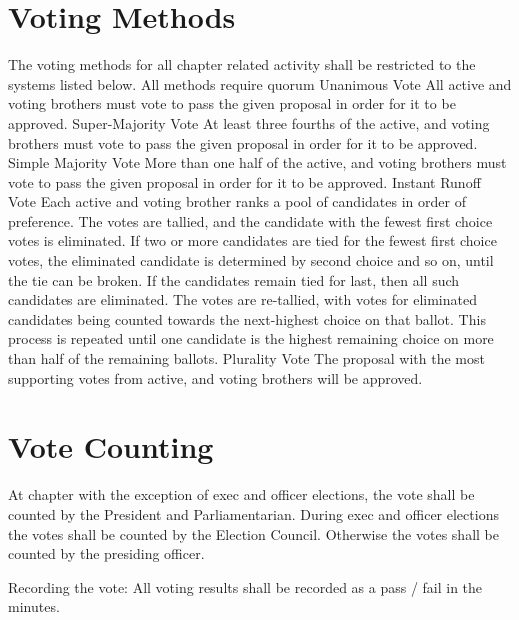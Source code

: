 \section{Voting Methods}
The voting methods for all chapter related activity shall be restricted to the systems listed below.
All methods require quorum
Unanimous Vote
All active and voting brothers must vote to pass the given proposal in order for it to be approved.
Super-Majority Vote
At least three fourths of the active, and voting brothers must vote to pass the given proposal in order for it to be approved.
Simple Majority Vote
More than one half of the active, and voting brothers must vote to pass the given proposal in order for it to be approved.
Instant Runoff Vote
Each active and voting brother ranks a pool of candidates in order of preference.
The votes are tallied, and the candidate with the fewest first choice votes is eliminated.
If two or more candidates are tied for the fewest first choice votes, the eliminated candidate is determined by second choice and so on, until the tie can be broken.
If the candidates remain tied for last, then all such candidates are eliminated.
The votes are re-tallied, with votes for eliminated candidates being counted towards the next-highest choice on that ballot.
This process is repeated until one candidate is the highest remaining choice on more than half of the remaining ballots.
Plurality Vote
The proposal with the most supporting votes from active, and voting brothers will be approved.
\section{Vote Counting}
At chapter with the exception of exec and officer elections, the vote shall be counted by the President and Parliamentarian.
During exec and officer elections the votes shall be counted by the Election Council.
Otherwise the votes shall be counted by the presiding officer.

Recording the vote: All voting results shall be recorded as a pass / fail in the minutes.

